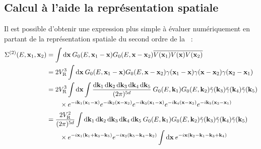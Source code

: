 \subsection{Calcul à l'aide la représentation spatiale}
Il est possible d'obtenir une expression plus simple à évaluer numériquement en partant de la représentation spatiale du second ordre de la \selfenergy\ \citep{akkermans2007mesoscopic}:
\begin{align}
\Sigma^{(2)}(E,\mathbf{x}_{\mathrm{1}},\mathbf{x}_{\mathrm{2}}) &= \int{\diff \mathbf{x} \: G_0(E,\mathbf{x}_{\mathrm{1}} - \mathbf{x}) G_0(E,\mathbf{x}-\mathbf{x}_{\mathrm{2}}) \overline{V(\mathbf{x}_{\mathrm{1}})V(\mathbf{x})V(\mathbf{x}_{\mathrm{2}})}} \\
&=2 \VR^3 \int{\diff\mathbf{x} \: G_0(E,\mathbf{x}_{\mathrm{1}} - \mathbf{x}) G_0(E,\mathbf{x}-\mathbf{x}_{\mathrm{2}}) \gamma(\mathbf{x}_{\mathrm{1}}-\mathbf{x})\gamma(\mathbf{x}-\mathbf{x}_{\mathrm{2}})\gamma(\mathbf{x}_{\mathrm{2}}-\mathbf{x}_{\mathrm{1}})} \\
&=2 \VR^3 \int{\diff\mathbf{x} \int{\frac{\diff\mathbf{k}_{\mathrm{1}}\diff\mathbf{k}_{\mathrm{2}}\diff\mathbf{k}_{\mathrm{3}}\diff\mathbf{k}_{\mathrm{4}}\diff\mathbf{k}_{\mathrm{5}}}{(2\pi)^{5d}}\: G_0(E,\mathbf{k}_{\mathrm{1}}) G_0(E,\mathbf{k}_{\mathrm{2}}) \tilde{\gamma}(\mathbf{k}_{\mathrm{3}})\tilde{\gamma}(\mathbf{k}_{\mathrm{4}})\tilde{\gamma}(\mathbf{k}_{\mathrm{5}}) }} \\
&\nonumber \qquad\times e^{-i\mathbf{k}_{\mathrm{1}}(\mathbf{x}_{\mathrm{1}}-\mathbf{x})} e^{-i\mathbf{k}_{\mathrm{2}}(\mathbf{x}-\mathbf{x}_{\mathrm{2}})} e^{-i\mathbf{k}_{\mathrm{3}}(\mathbf{x}_{\mathrm{1}}-\mathbf{x})} e^{-i\mathbf{k}_{\mathrm{4}}(\mathbf{x}-\mathbf{x}_{\mathrm{2}})} e^{-i\mathbf{k}_{\mathrm{5}}(\mathbf{x}_{\mathrm{2}}-\mathbf{x}_{\mathrm{1}})} \\
&= \frac{2\VR^2}{(2\pi)^{5d}} \int{\diff\mathbf{k}_{\mathrm{1}}\diff\mathbf{k}_{\mathrm{2}}\diff\mathbf{k}_{\mathrm{3}}\diff\mathbf{k}_{\mathrm{4}}\diff\mathbf{k}_{\mathrm{5}}\: G_0(E,\mathbf{k}_{\mathrm{1}}) G_0(E,\mathbf{k}_{\mathrm{2}}) \tilde{\gamma}(\mathbf{k}_{\mathrm{3}})\tilde{\gamma}(\mathbf{k}_{\mathrm{4}})\tilde{\gamma}(\mathbf{k}_{\mathrm{5}})}\\
&\nonumber \qquad \times e^{-i\mathbf{x}_{\mathrm{1}} (\mathbf{k}_{\mathrm{1}}+\mathbf{k}_{\mathrm{3}}-\mathbf{k}_{\mathrm{5}})} e^{-i\mathbf{x}_{\mathrm{2}}(\mathbf{k}_{\mathrm{5}}-\mathbf{k}_{\mathrm{4}}-\mathbf{k}_{\mathrm{2}})} \int{\diff\mathbf{x}\: e^{-i\mathbf{x}(\mathbf{k}_{\mathrm{2}}-\mathbf{k}_{\mathrm{1}}-\mathbf{k}_{\mathrm{3}}+\mathbf{k}_{\mathrm{4}})}}\\

\end{align}
